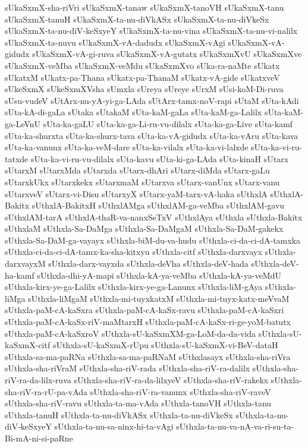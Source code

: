 {sUkaSxmX-sha-riVri
sUkaSxmX-tanaw
sUkaSxmX-tanoVH
sUkaSxmX-tanu
sUkaSxmX-tanuH
sUkaSxmX-ta-nu-diVkASx
sUkaSxmX-ta-nu-diVkeSx
sUkaSxmX-ta-nu-diV-keSxyeY
sUkaSxmX-ta-nu-vina
sUkaSxmX-ta-nu-vi-nalilx
sUkaSxmX-ta-nuvu
sUkaSxmX-vA-dadudx
sUkaSxmX-vAgi
sUkaSxmX-vA-gidudx
sUkaSxmX-vA-gi-ruva
sUkaSxmX-vA-gutatx
sUkaSxmXvU
sUkaSxmXve
sUkaSxmX-veMba
sUkaSxmX-veMdu
sUkaSxmXvo
sUka-ra-naMte
sUkatx
sUkatxM
sUkatx-pa-Thana
sUkatx-pa-ThanaM
sUkatx-vA-gide
sUkatxveV
sUkeSxmX
sUkeSxmXVsha
sUmxla
sUreya
sUreye
sUrxM
sUsi-koM-Di-ruva
sUsu-vudeV
sUtArx-nu-yA-yi-ga-LAda
sUtArx-tamx-noV-rapi
sUtaM
sUta-kAdi
sUta-kA-di-gaLa
sUtaka
sUtakaM
sUta-kaM-gaLa
sUta-kaM-ga-Lalilx
sUta-kaM-ga-LeVnU
sUta-ka-gaLU
sUta-ka-ga-Li-ru-vu-dilalx
sUta-ka-ga-Live
sUta-kamf
sUta-ka-shurxta
sUta-ka-shurx-tava
sUta-ka-vA-gidudx
sUta-ka-vAru
sUta-kava
sUta-ka-vanunx
sUta-ka-veM-dare
sUta-ka-vilalx
sUta-ka-vi-lalxde
sUta-ka-vi-ru-tatxde
sUta-ka-vi-ru-vu-dilalx
sUta-kavu
sUta-ki-ga-LAda
sUta-kinaH
sUtarx
sUtarxM
sUtarxMda
sUtarxda
sUtarx-dhAri
sUtarx-diMda
sUtarx-gaLu
sUtarxkUkx
sUtarxkekx
sUtarxmaM
sUtarxva
sUtarx-vanUnx
sUtarx-vanu
sUtarxveV
sUtarx-vi-Disu
sUtarxyX
sUtarx-yaM-tarx-vA-haka
sUthxlA
sUthxlA-Bakitx
sUthxlA-BakitxH
sUthxlAMga
sUthxlAM-ga-veMba
sUthxlAM-gavu
sUthxlAM-tarA
sUthxlA-thaR-va-nanxSeTxV
sUthxlAya
sUthxla
sUthxla-Bakitx
sUthxlaM
sUthxla-Sa-DaMga
sUthxla-Sa-DaMgaM
sUthxla-Sa-DaM-gakekx
sUthxla-Sa-DaM-ga-vayayx
sUthxla-biM-du-va-hudu
sUthxla-ci-da-ci-dA-tamxka
sUthxla-ci-da-ci-dA-tamx-ka-sha-kitxyu
sUthxla-citf
sUthxla-darxvayx
sUthxla-darxvayxM
sUthxla-darx-vayxda
sUthxla-deVha
sUthxla-deV-hada
sUthxla-deV-ha-kamf
sUthxla-dhi-yA-mapi
sUthxla-kA-ya-veMba
sUthxla-kA-ya-veMdU
sUthxla-kirx-ye-ga-Lalilx
sUthxla-kirx-ye-ga-Lanunx
sUthxla-liM-gAya
sUthxla-liMga
sUthxla-liMgaM
sUthxla-mi-tuyxkatxM
sUthxla-mi-tuyx-katx-meVvaM
sUthxla-paM-cA-kaSxra
sUthxla-paM-cA-kaSx-ravu
sUthxla-paM-cA-kaSxri
sUthxla-paM-cA-kaSx-riV-maMtarxH
sUthxla-paM-cA-kaSx-ri-ge-yoM-batutx
sUthxla-paM-cA-kaSxroV
sUthxla-sU-kaSxmXM-ga-LoM-da-da-vida
sUthxla-sU-kaSxmX-citf
sUthxla-sU-kaSxmX-rUpu
sUthxla-sU-kaSxmX-vi-BeV-dataH
sUthxla-sa-ma-paRNa
sUthxla-sa-ma-paRNaM
sUthxlasayx
sUthxla-sha-riVra
sUthxla-sha-riVraM
sUthxla-sha-riV-rada
sUthxla-sha-riV-ra-dalilx
sUthxla-sha-riV-ra-da-lilx-ruva
sUthxla-sha-riV-ra-da-lilxyeV
sUthxla-sha-riV-rakekx
sUthxla-sha-riV-ra-rU-pa-vAda
sUthxla-sha-riV-ra-vanunx
sUthxla-sha-riV-raveV
sUthxla-sha-riV-ravu
sUthxla-ta-ma-vAda
sUthxla-tanoVH
sUthxla-tanu
sUthxla-tanuH
sUthxla-ta-nu-diVkASx
sUthxla-ta-nu-diVkeSx
sUthxla-ta-nu-diV-keSxyeY
sUthxla-ta-nu-sa-ninx-hi-ta-vAgi
sUthxla-ta-nu-va-nA-va-ri-su-ta-Bi-mA-ni-si-paRne
}

